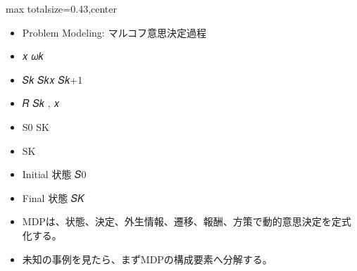 \clearpage
{}
\begin{minipage}[t]{0.405\textwidth}
\begin{adjustbox}{max totalsize={\textwidth}{0.43\textheight},center}
\begin{minipage}{\textwidth}\scriptsize
{}\begin{itemize}
\item Problem Modeling: マルコフ意思決定過程
\item 𝑥 𝜔𝑘
\item 𝑆𝑘 𝑆𝑘𝑥 𝑆𝑘+1
\item 𝑅 𝑆𝑘 , 𝑥
\item S0 SK
\item SK
\item Initial 状態 𝑆0
\item Final 状態 𝑆𝐾
\end{itemize}\begin{itemize}
\item MDPは、状態、決定、外生情報、遷移、報酬、方策で動的意思決定を定式化する。
\item 未知の事例を見たら、まずMDPの構成要素へ分解する。
\end{itemize}
\end{minipage}
\end{adjustbox}
\end{minipage}\hfill
